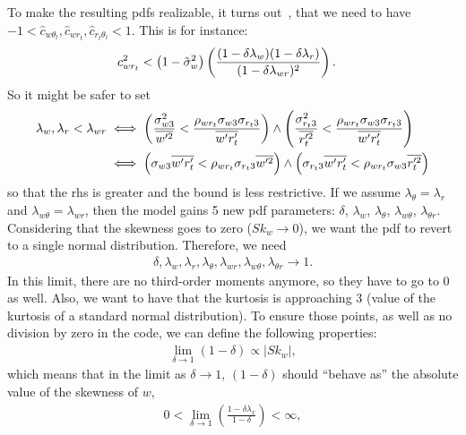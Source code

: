 To make the resulting \glspl{pdf} realizable, it turns out~\autocite{larson2022clubbsilhs}, that we need to have
$-1 < \widehat{c}_{w \theta_l}, \widehat{c}_{w r_t}, \widehat{c}_{r_t \theta_l} < 1$.
This is for instance:
\begin{align}
    c_{w r_t}^2 &< \left( 1 - \tilde{\sigma}_w^2 \right) \left(
    \frac{(1-\delta \lambda_w)(1-\delta \lambda_r)}{(1-\delta \lambda_{w r})^2}
    \right).
\end{align}
So it might be safer to set
\begin{align}
    \label{eq:lambda_corr_ineq}
    \lambda_w , \lambda_r < \lambda_{w r}
    &\iff
    \left(\frac{\sigma_{w 3}^2}{\overline{w'^2}} < \frac{\rho_{w r_t} \sigma_{w 3} \sigma_{r_t 3}}{\overline{w' r_t'}}\right)
    \land
    \left(\frac{\sigma_{r_t 3}^2}{\overline{r_t'^2}} < \frac{\rho_{w r_t} \sigma_{w 3} \sigma_{r_t 3}}{\overline{w' r_t'}}\right) \nonumber\\
    &\iff
    \left(\sigma_{w 3} \overline{w' r_t'} < \rho_{w r_t} \sigma_{r_t 3} \overline{w'^2}\right)
    \land
    \left(\sigma_{r_t 3} \overline{w' r_t'} < \rho_{w r_t} \sigma_{w 3} \overline{r_t'^2}\right) \nonumber\\
\end{align}
so that the \gls{rhs} is greater and the bound is less restrictive.
If we assume $\lambda_\theta = \lambda_r$ and $\lambda_{w\theta} = \lambda_{wr}$,
then the model gains 5 new \gls{pdf} parameters:
$\delta$, $\lambda_w$, $\lambda_\theta$, $\lambda_{w \theta}$, $\lambda_{\theta r}$.
Considering that the skewness goes to zero ($Sk_w \to 0$),
we want the \gls{pdf} to revert to a single normal distribution.
Therefore, we need
\begin{align}
    \delta, \lambda_w, \lambda_r, \lambda_\theta,
    \lambda_{w r}, \lambda_{w \theta}, \lambda_{\theta r}
    \to 1.
\end{align}
In this limit, there are no third-order moments anymore, so they have to go to 0 as well.
Also, we want to have that the kurtosis is approaching 3 (value of the kurtosis of a standard normal distribution).
To ensure those points, as well as no division by zero in the code, we can define the following properties:
\begin{align}
    \label{eq:delta_propto}
    \lim_{\delta \to 1} (1-\delta) \propto |Sk_w|,
\end{align}
which means that in the limit as $\delta \to 1$,
$(1-\delta)$ should \enquote{behave as} the absolute value of the skewness of $w$,
\begin{align}
    0 < \lim_{\delta\to 1} \left(\frac{1-\delta\lambda_x}{1-\delta}\right) < \infty,
\end{align}
